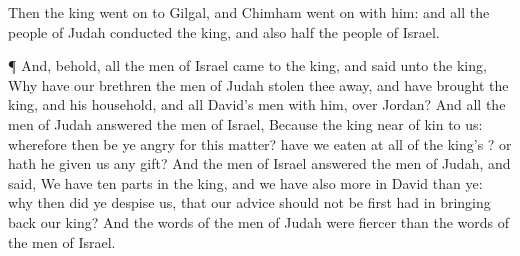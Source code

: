 {\par }{\PP {}Then the
king went
on to
Gilgal, and
Chimham went
on with him: and all the
people of
Judah
conducted the
king, and also
half the
people of
Israel.
\par }{\PP {}¶ And, behold, all the
men of
Israel
came to the
king, and
said unto the
king, Why have our
brethren the
men of
Judah stolen thee
away, and have
brought the
king, and his
household, and all
David’s
men with him, over
Jordan?
And all the
men of
Judah
answered the
men of
Israel, Because the
king
{} near of
kin to us: wherefore then be ye
angry for this
matter? have we
eaten at
all of the
king’s
{}? or hath he
given us any
gift?
And the
men of
Israel
answered the
men of
Judah, and
said, We have
ten
parts in the
king, and
we have also more
{} in
David than ye: why then did ye
despise us, that our
advice should not be
first had in bringing
back our
king? And the
words of the
men of
Judah were
fiercer than the
words of the
men of
Israel.

}

